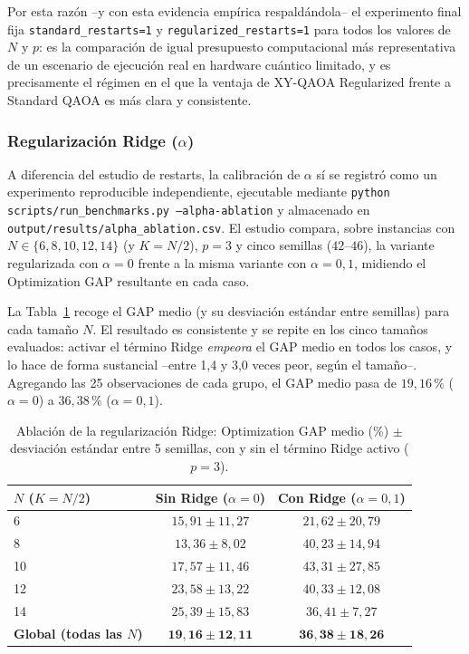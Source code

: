 Por esta razón --y con esta evidencia empírica respaldándola-- el experimento final fija \texttt{standard\_restarts=1} y \texttt{regularized\_restarts=1} para todos los valores de $N$ y $p$: es la comparación de igual presupuesto computacional más representativa de un escenario de ejecución real en hardware cuántico limitado, y es precisamente el régimen en el que la ventaja de XY-QAOA Regularized frente a Standard QAOA es más clara y consistente.

\subsubsection{Regularización Ridge ($\alpha$)}

A diferencia del estudio de restarts, la calibración de $\alpha$ sí se registró como un experimento reproducible independiente, ejecutable mediante \texttt{python scripts/run\_benchmarks.py --alpha-ablation} y almacenado en \texttt{output/results/alpha\_ablation.csv}. El estudio compara, sobre instancias con $N \in \{6, 8, 10, 12, 14\}$ (y $K=N/2$), $p=3$ y cinco semillas ($42$--$46$), la variante regularizada con $\alpha=0$ frente a la misma variante con $\alpha=0{,}1$, midiendo el Optimization GAP resultante en cada caso.

La Tabla~\ref{tab:alpha-ablation} recoge el GAP medio (y su desviación estándar entre semillas) para cada tamaño $N$. El resultado es consistente y se repite en los cinco tamaños evaluados: activar el término Ridge \emph{empeora} el GAP medio en todos los casos, y lo hace de forma sustancial --entre 1,4 y 3,0 veces peor, según el tamaño--. Agregando las 25 observaciones de cada grupo, el GAP medio pasa de $19{,}16\,\%$ ($\alpha=0$) a $36{,}38\,\%$ ($\alpha=0{,}1$).

\begin{table}[htbp]
\centering
\caption{Ablación de la regularización Ridge: Optimization GAP medio (\%) $\pm$ desviación estándar entre 5 semillas, con y sin el término Ridge activo ($p=3$).}
\label{tab:alpha-ablation}
\begin{tabular}{lcc}
\toprule
\textbf{$N$ ($K=N/2$)} & \textbf{Sin Ridge ($\alpha=0$)} & \textbf{Con Ridge ($\alpha=0{,}1$)} \\
\midrule
6  & $15{,}91 \pm 11{,}27$ & $21{,}62 \pm 20{,}79$ \\
8  & $13{,}36 \pm 8{,}02$  & $40{,}23 \pm 14{,}94$ \\
10 & $17{,}57 \pm 11{,}46$ & $43{,}31 \pm 27{,}85$ \\
12 & $23{,}58 \pm 13{,}22$ & $40{,}33 \pm 12{,}08$ \\
14 & $25{,}39 \pm 15{,}83$ & $36{,}41 \pm 7{,}27$ \\
\midrule
\textbf{Global (todas las $N$)} & $\mathbf{19{,}16 \pm 12{,}11}$ & $\mathbf{36{,}38 \pm 18{,}26}$ \\
\bottomrule
\end{tabular}
\end{table}


